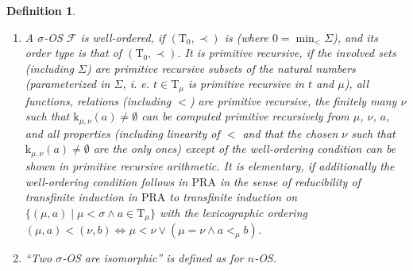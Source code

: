 \documentclass[10pt]{article}
\def \ssubitem#1{\item \label{\actlabel#1} }
\def\condition#1{\indent \hbox to 2.0cm{$(#1)$\hfill}}
\def\conditionbox#1{\indent \hbox to 2.0cm{#1\hfill}}
\newtheorem {definition} [lemma]{Definition}
\def\all{\forall}
\def\ar{\rightarrow}
\def \Iff{\Leftrightarrow}
\def\k{\mathrm{k}}
\def\krmtil{\widetilde{\mathrm{k}}}
\def\OS{{\mathrm{OS}}}
\def\T{\mathrm{T}}
\def\L{\mathrm{L}}
\def\level{\mathrm{level}}
\def\PRA{\mathrm{PRA}}
\def\calF{\mathcal{F}}
\begin{document}
\begin{definition}
{\begin{enumerate}
\condition{\sigma-\OS\ 3} if $r \prec  s$, then 
$r \preceq \k_{\mu,\mu}(s) \lor r \prec ' s \lor \level(r) \prec \level(s)$;\\
\condition{\sigma-\OS\ 4} if
$\xi < \nu$, then
$\k_{\nu,\xi} \circ \k_{\mu,\nu} \subseteq \k_{\mu,\xi}$;\\
\condition{\sigma-\OS\ 5} $\k_{\mu,\xi'}(r) = \emptyset$ for almost all
$\xi'< \sigma$;\\
\condition{\sigma-\OS\ 6} if $\mu<\nu$,  then
$\level[\k_{\mu,\nu}(r)]
\prec \level(r)$;\\
\condition{\sigma-\OS\ 7} if $r \prec  s$, then $\level(r)\preceq \level(s)$;\\
\condition{\sigma-\OS\ 8}
$\krmtil_\nu(\level(r))\subseteq \k_{\mu,\nu}(r)$;\\
\condition{\sigma-\OS\ 9} if $A_\xi \subseteq \T_\xi$ are $\prec$-well-ordered
($\xi< \sigma$), then
$(\T_\nu \restriction_{\mu< \sigma}A_\mu, \prec ')$ and \break 
\conditionbox{} $(\L \restriction_{\mu< \sigma}A_\mu, \prec)$ are well-ordered, too.
%
%
%
\ssubitem c A $\sigma$-OS $\calF$ is 
{\em well-ordered}, if $(\T_0,\prec)$ is (where $0=\min_<{\Sigma}$), 
and its {\em order type} is 
that of $(\T_0,\prec)$. It is 
{\em primitive recursive}, if
the involved sets (including $\Sigma$)
are primitive recursive subsets of the natural numbers
(parameterized in $\Sigma$, i. e.
$t \in \T_{\mu}$ is primitive recursive in $t$ and $\mu$),
all functions, relations (including $<$) 
are primitive recursive, 
the finitely many $\nu$ such that $\k_{\mu,\nu}(a)
\not = \emptyset$ can be computed primitive recursively from 
$\mu$, $\nu$, $a$, and all properties
(including linearity of $<$ and that the chosen $\nu$ such
that $\k_{\mu,\nu}(a) \not = \emptyset$ are the only ones)
except of the well-ordering condition can be shown in
primitive recursive arithmetic.
It is {\em elementary}, if additionally
the well-ordering condition follows in $\PRA$  in the sense of
reducibility of transfinite induction in $\PRA$ to transfinite induction 
on $\{ (\mu,a) \mid \mu < \sigma \land a \in \T_\mu \}$
with the lexicographic ordering 
$(\mu,a) < (\nu,b) \Iff \mu < \nu \lor 
(\mu = \nu \land a <_\mu b)$.
\ssubitem d ``Two $\sigma$-OS are isomorphic'' is defined
as for $n$-OS.
\end{enumerate}}
\end{definition}
\end{document}
